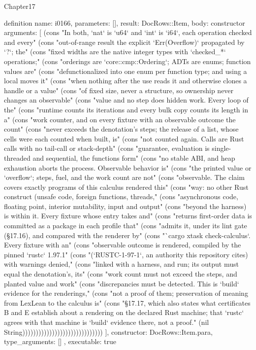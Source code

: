 \begin{lexlean}{Chapter17}
\begin{semanticmodule}
definition{
  name: i0166,
  parameters: [],
  result: DocRows::Item,
  body: constructor{
    arguments: [
      (cons "In both, `nat` is `u64` and `int` is `i64`, each operation checked and every" (cons "out-of-range result the explicit `Err(Overflow)` propagated by `?`; the" (cons "fixed widths are the native integer types with `checked_*` operations;" (cons "orderings are `core::cmp::Ordering`; ADTs are enums; function values are" (cons "defunctionalized into one enum per function type; and using a local moves it" (cons "when nothing after the use reads it and otherwise clones a handle or a value" (cons "of fixed size, never a structure, so ownership never changes an observable" (cons "value and no step does hidden work. Every loop of the" (cons "runtime counts its iterations and every bulk copy counts its length in a" (cons "work counter, and on every fixture with an observable outcome the count" (cons "never exceeds the denotation's steps; the release of a list, whose cells were each counted when built, is" (cons "not counted again. Calls are Rust calls with no tail-call or stack-depth" (cons "guarantee, evaluation is single-threaded and sequential, the functions form" (cons "no stable ABI, and heap exhaustion aborts the process. Observable behavior is" (cons "the printed value or `overflow`; steps, fuel, and the work count are not" (cons "observable. The claim covers exactly programs of this calculus rendered this" (cons "way: no other Rust construct (unsafe code, foreign functions, threads," (cons "asynchronous code, floating point, interior mutability, input and output" (cons "beyond the harness) is within it. Every fixture whose entry takes and" (cons "returns first-order data is committed as a package in each profile that" (cons "admits it, under its lint gate (§17.16), and compared with the renderer by" (cons "`cargo xtask check-calculus`. Every fixture with an" (cons "observable outcome is rendered, compiled by the pinned `rustc` 1.97.1" (cons "(`RUSTC-1-97-1`, an authority this repository cites) with warnings denied," (cons "linked with a harness, and run; its output must equal the denotation's, its" (cons "work count must not exceed the steps, and planted value and work" (cons "discrepancies must be detected. This is `build` evidence for the renderings," (cons "not a proof of them; preservation of meaning from LexLean to the calculus is" (cons "§17.17, which also states what certificates B and E establish about a rendering on the declared Rust machine; that `rustc` agrees with that machine is `build` evidence there, not a proof." (nil String))))))))))))))))))))))))))))))
    ],
    constructor: DocRows::Item.para,
    type_arguments: []
  },
  executable: true
}


\end{semanticmodule}
\end{lexlean}
